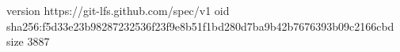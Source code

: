 version https://git-lfs.github.com/spec/v1
oid sha256:f5d33e23b98287232536f23f9e8b51f1bd280d7ba9b42b7676393b09c2166cbd
size 3887
